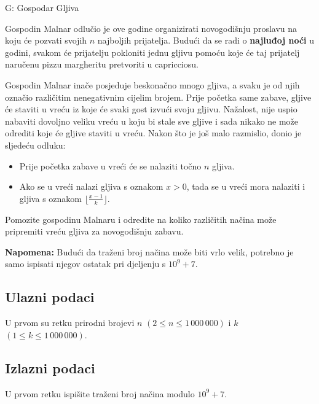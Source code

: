 \begin{statement}[
  timelimit=1 s,
  memorylimit=512 MiB,
]{G: Gospodar Gljiva}

Gospodin Malnar odlučio je ove godine organizirati novogodišnju proslavu na
koju će pozvati svojih $n$ najboljih prijatelja. Budući da se radi o
\textbf{najluđoj noći} u godini, svakom će prijatelju pokloniti jednu gljivu
pomoću koje će taj prijatelj naručenu pizzu margheritu pretvoriti u capricciosu.

Gospodin Malnar inače posjeduje beskonačno mnogo gljiva, a svaku je od njih
označio različitim nenegativnim cijelim brojem. Prije početka same zabave,
gljive će staviti u vreću iz koje će svaki gost izvući svoju gljivu.
Nažalost, nije uspio nabaviti dovoljno veliku vreću u koju bi stale sve
gljive i sada nikako ne može odrediti koje će gljive staviti u vreću. Nakon
što je još malo razmislio, donio je sljedeću odluku:

\vspace{-2.5mm}
\begin{itemize}
    \item Prije početka zabave u vreći će se nalaziti točno $n$ gljiva.
    \item Ako se u vreći nalazi gljiva s oznakom $x > 0$, tada se u vreći mora
      nalaziti i gljiva s oznakom $\lfloor \frac{x-1}{k} \rfloor$.
\end{itemize}
\vspace{-2.5mm}

Pomozite gospodinu Malnaru i odredite na koliko različitih načina može
pripremiti vreću gljiva za novogodišnju zabavu.

\textbf{Napomena:} Budući da traženi broj načina može biti vrlo velik, potrebno
je samo ispisati njegov ostatak pri djeljenju s $10^9+7$.

\subsection*{Ulazni podaci}
U prvom su retku prirodni brojevi $n$ $(2 \le n \le 1\,000\,000)$ i $k$
$(1 \le k \le 1\,000\,000)$.

\subsection*{Izlazni podaci}
U prvom retku ispišite traženi broj načina modulo $10^9 + 7$.


\end{statement}
